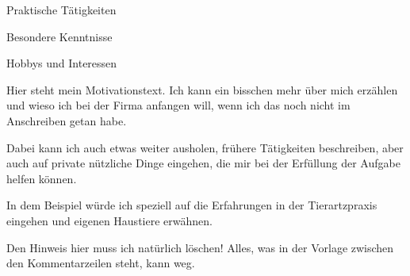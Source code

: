 \documentclass[12pt,parskip=half-]{scrartcl}
\begin{document}
\begin{Lebenslauf}
\NeueSeiteAbschnittCV

\begin{AbschnittCV}{Praktische Tätigkeiten}%
\end{AbschnittCV}

\begin{AbschnittCV}{Besondere Kenntnisse}%
\end{AbschnittCV}

\begin{AbschnittCV}{Hobbys und Interessen}%
\end{AbschnittCV}

\end{Lebenslauf}


\begin{Motivation}
    Hier steht mein Motivationstext. Ich kann ein bisschen mehr
    über mich erzählen und wieso ich bei der Firma anfangen will,
    wenn ich das noch nicht im Anschreiben getan habe.
    
    Dabei kann ich auch etwas weiter ausholen, frühere Tätigkeiten
    beschreiben, aber auch auf private nützliche Dinge eingehen,
    die mir bei der Erfüllung der Aufgabe helfen können.
    
    In dem Beispiel würde ich speziell auf die Erfahrungen in der
    Tierartzpraxis eingehen und eigenen Haustiere erwähnen.
    
    Den Hinweis hier muss ich natürlich löschen! Alles, was in der Vorlage
    zwischen den Kommentarzeilen steht, kann weg.
\end{Motivation}
\end{document}
